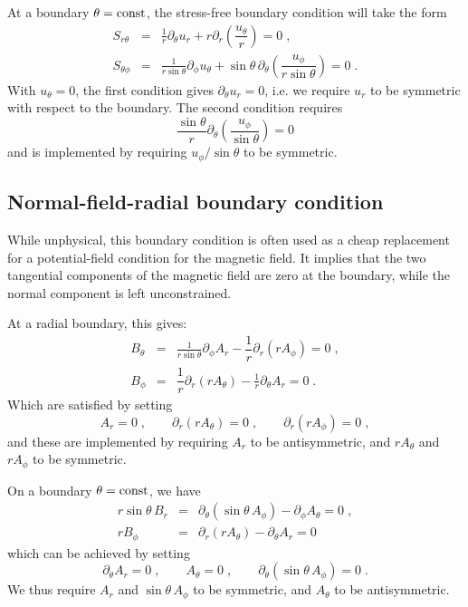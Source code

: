 \documentclass[\mydriver,12pt,twoside,notitlepage,a4paper]{article}
\newcommand{\const}   {\mbox{\rm const}}
\begin{document}
At a boundary $\theta=\const$, the stress-free boundary condition will
take the form
\begin{eqnarray}
  S_{r\theta} &=& \frac{1}{r}\partial_{\theta} u_r
                  + r \partial_r \left( \dfrac{u_\theta}{r} \right)
               = 0 \; , \\
  S_{\theta\phi} &=& \frac{1}{r\sin\theta} \partial_{\phi} u_{\theta}
                     + \sin\theta \,
                       \partial_\theta
                       \left( \dfrac{u_\phi}{r\sin\theta} \right)
               = 0 \; .
\end{eqnarray}
With $u_{\theta} = 0$, the first condition gives $\partial_\theta u_r=0$,
i.e. we require $u_r$ to be symmetric with respect to the boundary.
The second condition requires
\begin{equation}
  \dfrac{\sin\theta}{r}
  \partial_{\theta}
  \left(\dfrac{u_{\phi}}{\sin\theta}\right)
  = 0
\end{equation}
and is implemented by requiring $u_{\phi} / \sin\theta$ to be symmetric.


\subsection{Normal-field-radial boundary condition}
While unphysical, this boundary condition is often used as a cheap
replacement for a potential-field condition for the magnetic field.
It implies that the two tangential components of the magnetic field are
zero at the boundary, while the normal component is left unconstrained.

At a radial boundary, this gives:
\begin{eqnarray}
  B_{\theta} &=& \frac{1}{r\sin\theta} \partial_{\phi} A_r
                 - \dfrac{1}{r} \partial_r (r A_{\phi})
              = 0 \; , \\
  B_{\phi}   &=& \dfrac{1}{r} \partial_{r} (r A_{\theta})
                 - \frac{1}{r} \partial_{\theta} A_{r}
              = 0 \; .
\end{eqnarray}
Which are satisfied by setting
\begin{equation}
  A_r = 0 \; ,
  \qquad
  \partial_r (r A_\theta) = 0 \; ,
  \qquad
  \partial_r (r A_\phi) = 0 \; ,
\end{equation}
and these are implemented by requiring $A_r$ to be antisymmetric, and
$r A_\theta$ and $r A_\phi$ to be symmetric.

On a boundary $\theta = \const$, we have
\begin{eqnarray}
  r \sin \theta \, B_r
    &=& \partial_{\theta} (\sin\theta \, A_\phi)
        - \partial_\phi A_\theta
     = 0 \; , \\
  r B_\phi
    &=& \partial_r (r A_\theta) - \partial_\theta A_r
     = 0
\end{eqnarray}
which can be achieved by setting
\begin{equation}
  \partial_\theta A_r = 0 \; ,
  \qquad
  A_\theta = 0 \; ,
  \qquad
  \partial_\theta (\sin\theta \, A_\phi) = 0 \; .
\end{equation}
We thus require $A_r$ and $\sin\theta \, A_\phi$ to be symmetric, and
$A_\theta$ to be antisymmetric.
\end{document}
